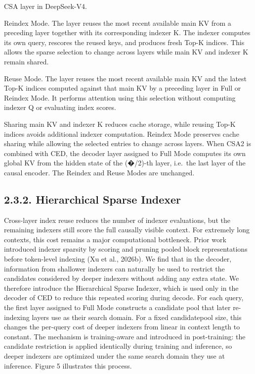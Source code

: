 \documentclass[
  10
]{article}
\begin{document}
CSA layer in DeepSeek-V4.

Reindex Mode. The layer reuses the most recent available main KV from a
preceding layer together with its corresponding indexer K. The indexer
computes its own query, rescores the reused keys, and produces fresh
Top-K indices. This allows the sparse selection to change across layers
while main KV and indexer K remain shared.

Reuse Mode. The layer reuses the most recent available main KV and the
latest Top-K indices computed against that main KV by a preceding layer
in Full or Reindex Mode. It performs attention using this selection
without computing indexer Q or evaluating index scores.

Sharing main KV and indexer K reduces cache storage, while reusing Top-K
indices avoids additional indexer computation. Reindex Mode preserves
cache sharing while allowing the selected entries to change across
layers. When CSA2 is combined with CED, the decoder layer assigned to
Full Mode computes its own global KV from the hidden state of the
(�/2)-th layer, i.e.~the last layer of the causal encoder. The Reindex
and Reuse Modes are unchanged.

\subsection{2.3.2. Hierarchical Sparse
Indexer}\label{hierarchical-sparse-indexer}

Cross-layer index reuse reduces the number of indexer evaluations, but
the remaining indexers still score the full causally visible context.
For extremely long contexts, this cost remains a major computational
bottleneck. Prior work introduced indexer sparsity by scoring and
pruning pooled block representations before token-level indexing (Xu et
al., 2026b). We find that in the decoder, information from shallower
indexers can naturally be used to restrict the candidates considered by
deeper indexers without adding any extra state. We therefore introduce
the Hierarchical Sparse Indexer, which is used only in the decoder of
CED to reduce this repeated scoring during decode. For each query, the
first layer assigned to Full Mode constructs a candidate pool that later
re-indexing layers use as their search domain. For a fixed candidatepool
size, this changes the per-query cost of deeper indexers from linear in
context length to constant. The mechanism is training-aware and
introduced in post-training: the candidate restriction is applied
identically during training and inference, so deeper indexers are
optimized under the same search domain they use at inference. Figure 5
illustrates this process.
\end{document}

